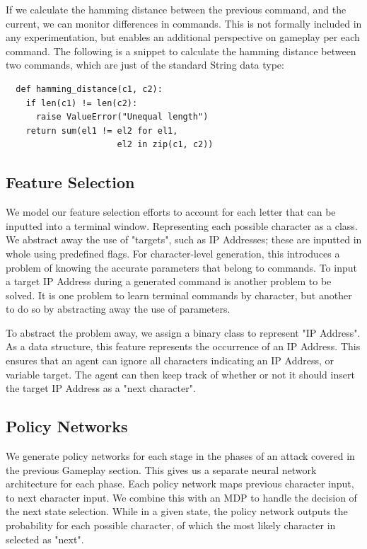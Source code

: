\documentclass[10pt, titlepage, twocolumn]{article}
\newcommand{\ii}{\indent\indent}
\begin{document}
If we calculate the hamming distance between the previous command, and the current, we can monitor differences in commands. This is not formally included in any experimentation, but enables an additional perspective on gameplay per each command. The following is a snippet to calculate the hamming distance between two commands, which are just of the standard String data type: 

\begin{verbatim}
  def hamming_distance(c1, c2):
    if len(c1) != len(c2):
      raise ValueError("Unequal length")
    return sum(el1 != el2 for el1, 
                      el2 in zip(c1, c2))
\end{verbatim}

\subsection{Feature Selection}
\ii
We model our feature selection efforts to account for each letter that can be inputted into a terminal window. Representing each possible character as a class. We abstract away the use of "targets", such as IP Addresses; these are inputted in whole using predefined flags. For character-level generation, this introduces a problem of knowing the accurate parameters that belong to commands. To input a target IP Address during a generated command is another problem to be solved. It is one problem to learn terminal commands by character, but another to do so by abstracting away the use of parameters.

To abstract the problem away, we assign a binary class to represent "IP Address". As a data structure, this feature represents the occurrence of an IP Address. This ensures that an agent can ignore all characters indicating an IP Address, or variable target. The agent can then keep track of whether or not it should insert the target IP Address as a "next character".


\subsection{Policy Networks}
\ii
We generate policy networks for each stage in the phases of an attack covered in the previous Gameplay section. This gives us a separate neural network architecture for each phase. Each policy network maps previous character input, to next character input. We combine this with an MDP to handle the decision of the next state selection. While in a given state, the policy network outputs the probability for each possible character, of which the most likely character in selected as "next".
\end{document}
